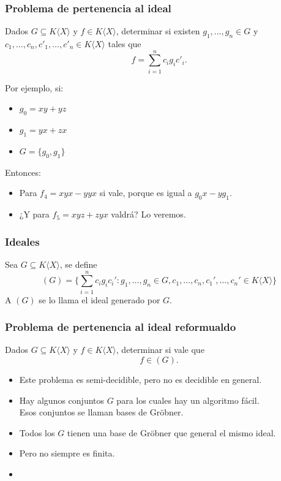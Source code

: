 \documentclass[spanish, aspectratio=169, hidecontrols]{beamer}
\begin{document}
\begin{frame}
  \frametitle{Problema de pertenencia al ideal}
  Dados $G ⊆ K⟨X⟩$ y $f ∈ K⟨X⟩$, determinar si existen $g_1, …, g_n ∈ G$ y $c_1, …, c_n, c'_1, …, c'_n ∈ K⟨X⟩$ tales que
  \[ f = ∑_{i = 1}^n c_i g_i c'_i \text{.}\]
  \pause
  \begin{exampleblock}{Por ejemplo, si:}
    \begin{itemize}
      \item $g_0 = xy + yz$
      \item $g_1 = yx + zx$
      \item $G = \{g_0, g_1\}$
    \end{itemize}
    Entonces:
    \begin{itemize}
      \item Para $f_4 = xyx - yyx$ si vale\pause, porque es igual a $g_0 x - y g_1$. %
      \pause
      \item ¿Y para $f_5 = xyz + zyx$ valdrá? \pause Lo veremos.
    \end{itemize}
  \end{exampleblock}

\end{frame}

\begin{frame}
  \frametitle{Ideales}
  \pause
  Sea $G ⊆ K⟨X⟩$, se define
  \[ (G) = \{∑_{i = 1}^n c_i g_i c_i' : g_1, …, g_n ∈ G, c_1, …, c_n, c_1', …, c_n' ∈ K⟨X⟩\} \]
  A $(G)$ se lo llama el ideal generado por $G$.
\end{frame}

\begin{frame}
  \frametitle{Problema de pertenencia al ideal reformualdo}
  Dados $G ⊆ K⟨X⟩$ y $f ∈ K⟨X⟩$, determinar si vale que
  \[ f ∈ (G) \text{.}\]
  \pause
  \begin{itemize}
    \item Este problema es semi-decidible\pause, pero no es decidible en general.
    \pause %
    \item Hay algunos conjuntos $G$ para los cuales hay un algoritmo fácil. \pause \\ %
    Esos conjuntos se llaman bases de Gröbner.
    \pause
    \item Todos los $G$ tienen una base de Gröbner que general el mismo ideal.
    \pause
    \item Pero no siempre es finita.
    \item %
  \end{itemize}
\end{frame}
\end{document}
